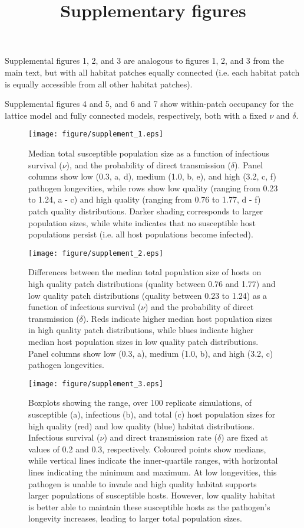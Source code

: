 \documentclass{article}
\title{Supplementary figures}
\begin{document}
\maketitle

Supplemental figures 1, 2, and 3 are analogous to figures 1, 2, and 3 from the main text, but with all habitat patches equally connected (i.e. each habitat patch is equally accessible from all other habitat patches).

Supplemental figures 4 and 5, and 6 and 7 show within-patch occupancy for the lattice model and fully connected models, respectively, both with a fixed $\nu$ and $\delta$.

\begin{figure}
\texttt{[image: figure/supplement\_1.eps]}
\caption{Median total susceptible population size as a function of infectious survival ($\nu$), and the probability of direct transmission ($\delta$).  Panel columns show low (0.3, a, d), medium (1.0, b, e), and high (3.2, c, f) pathogen longevities, while rows show low quality (ranging from 0.23 to 1.24, a - c) and high quality (ranging from 0.76 to 1.77, d - f) patch quality distributions.  Darker shading corresponds to larger population sizes, while white indicates that no susceptible host populations persist (i.e. all host populations become infected).}
\label{endemic}
\end{figure}

\begin{figure}
\texttt{[image: figure/supplement\_2.eps]}
\centering
\caption{Differences between the median total population size of hosts on high quality patch distributions (quality between 0.76 and 1.77) and low quality patch distributions (quality between 0.23 to 1.24) as a function of infectious survival ($\nu$) and the probability of direct transmission ($\delta$).  Reds indicate higher median host population sizes in high quality patch distributions, while blues indicate higher median host population sizes in low quality patch distributions.  Panel columns show low (0.3, a), medium (1.0, b), and high (3.2, c) pathogen longevities.}
\label{highvlow}
\end{figure}

\begin{figure}
\texttt{[image: figure/supplement\_3.eps]}
\centering
\caption{Boxplots showing the range, over 100 replicate simulations, of susceptible (a), infectious (b), and total (c) host population sizes for high quality (red) and low quality (blue) habitat distributions.  Infectious survival ($\nu$) and direct transmission rate ($\delta$) are fixed at values of 0.2 and 0.3, respectively.  Coloured points show medians, while vertical lines indicate the inner-quartile ranges, with horizontal lines indicating the minimum and maximum.  At low longevities, this pathogen is unable to invade and high quality habitat supports larger populations of susceptible hosts.  However, low quality habitat is better able to maintain these susceptible hosts as the pathogen's longevity increases, leading to larger total population sizes.}
\label{popsizes}
\end{figure}
\end{document}
